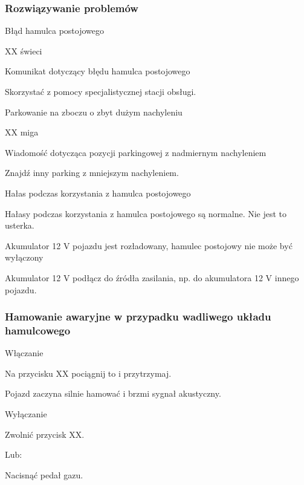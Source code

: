 \subsubsection{Rozwiązywanie problemów}

Błąd hamulca postojowego

XX świeci

Komunikat dotyczący błędu hamulca postojowego
\begin{itemizeArrow}
	\itemArrow Skorzystać z pomocy specjalistycznej stacji obsługi.
\end{itemizeArrow}

Parkowanie na zboczu o zbyt dużym nachyleniu

XX miga

Wiadomość dotycząca pozycji parkingowej z nadmiernym nachyleniem
\begin{itemizeArrow}
	\itemArrow Znajdź inny parking z mniejszym nachyleniem.
\end{itemizeArrow}

Hałas podczas korzystania z hamulca postojowego

Hałasy podczas korzystania z hamulca postojowego są normalne. Nie jest to usterka.

Akumulator 12 V pojazdu jest rozładowany, hamulec postojowy nie może być wyłączony

\begin{itemizeArrow}
	\itemArrow Akumulator 12 V podłącz do źródła zasilania, np. do akumulatora 12 V innego pojazdu.
\end{itemizeArrow}

\subsubsection{Hamowanie awaryjne w przypadku wadliwego układu hamulcowego}

Włączanie
\begin{itemizeArrow}
	\itemArrow Na przycisku XX pociągnij to i przytrzymaj.
\end{itemizeArrow}

Pojazd zaczyna silnie hamować i brzmi sygnał akustyczny.

Wyłączanie
\begin{itemizeArrow}
	\itemArrow Zwolnić przycisk XX.
\end{itemizeArrow}
Lub:
\begin{itemizeArrow}
	\itemArrow Nacisnąć pedał gazu.
\end{itemizeArrow}

